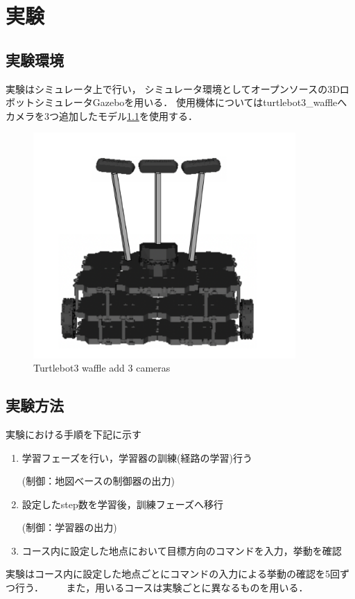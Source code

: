 \chapter{実験}
\section{実験環境}
実験はシミュレータ上で行い，
シミュレータ環境としてオープンソースの3DロボットシミュレータGazebo\cite{gazebo:online}を用いる．
使用機体についてはturtlebot3\_waffle\cite{turtlebot3:online}へカメラを3つ追加したモデル\ref{fig::turtlebot3}を使用する．

\begin{figure}[H]
    \centering
    \includegraphics[width = 10cm]{./figs/3_camera.png}
    \caption{Turtlebot3 waffle add 3 cameras}
    \label{fig::turtlebot3}
\end{figure}

\section{実験方法}

実験における手順を下記に示す
\begin{enumerate}
  \item 学習フェーズを行い，学習器の訓練(経路の学習)行う　
        
  (制御：地図べースの制御器の出力)
  \item 設定したstep数を学習後，訓練フェーズへ移行　
  
  (制御：学習器の出力)
  \item コース内に設定した地点において目標方向のコマンドを入力，挙動を確認
\end{enumerate}
実験はコース内に設定した地点ごとにコマンドの入力による挙動の確認を5回ずつ行う． 
　　また，用いるコースは実験ごとに異なるものを用いる．

